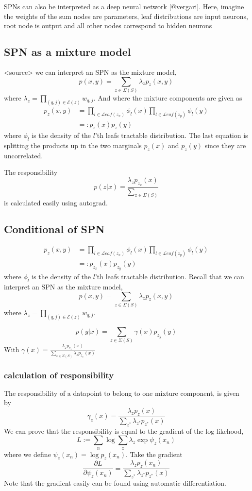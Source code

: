 SPNs can also be interpreted as a deep neural network [@vergari]. Here, imagine the
weights of the sum nodes are parameters, leaf distributions are input neurons, root node is output and
all other nodes correspond to hidden neurons

\subsection{SPN as a mixture model}
<source> we can interpret an SPN as the mixture model, 
$$p(x,y) = \sum_{z \in \Sigma(S)} \lambda_z p_z(x,y)$$
where $\lambda_z = \prod_{(q,j) \in \mathcal{E}(z)} w_{q,j}$. And where
the mixture components are given as 
\begin{align*}
    p_z(x,y) &= \prod_{l \in \mathcal{L}eaf(z_x)} \phi_l(x)\prod_{l \in \mathcal{L}eaf(z_y)} \phi_l(y)\\
            &=: p_{z}(x) p_{z}(y) 
\end{align*}
where $\phi_l$ is the density of the $l$'th leafs tractable distribution. The last equation
is splitting the products up in the two marginals $p_z(x)$ and $p_z(y)$ since they are uncorrelated. 

The responsibility 
$$p(z|x) = \frac{ \lambda_z p_{z_x}(x)}{\sum_{z \in \Sigma(S)} }$$
is calculated easily using autograd. 

\subsection{Conditional of SPN}
\begin{align*}
    p_z(x,y) &= \prod_{l \in \mathcal{L}eaf(z_x)} \phi_l(x)\prod_{l \in \mathcal{L}eaf(z_y)} \phi_l(y)\\
            &=: p_{z_x}(x) p_{z_y}(y) 
\end{align*}
where $\phi_l$ is the density of the $l$'th leafs tractable distribution. Recall that we can interpret an SPN
as the mixture model, 
$$p(x,y) = \sum_{z \in \Sigma(S)} \lambda_z p_z(x,y)$$
where $\lambda_z = \prod_{(q,j) \in \mathcal{E}(z)} w_{q,j}$.

$$p(y|x)=\sum_{z \in \Sigma(S)} \gamma(x) p_{z_y}(y)$$
With $\gamma(x) = \frac{ \lambda_z p_{z_x}(x)}{\sum_{z \in \Sigma(S)} \lambda_z p_{z_x}(x)}$ 

\subsubsection{calculation of responsibility}
The responsibility of a datapoint to belong to one mixture component, is given by
$$\gamma_z(x) = \frac{\lambda_z p_z(x)}{\sum_{z^*} \lambda_{z^*} p_{z^*}(x)}$$
We can prove that the responsibility is equal to the gradient of the log likehood, 
$$L:= \sum_n \log \sum_z \lambda_z \exp \psi_z(x_n)$$
where we define $\psi_z(x_n) = \log p_z(x_n)$. Take the gradient 
$$\frac{\partial L}{\partial \psi_{z}(x_{n})} = \frac{\lambda_z p_z(x_n)}{\sum_{z^*} \lambda_{z^*} p_{z^*}(x)}$$
Note that the gradient easily can be found using automatic differentiation. 



